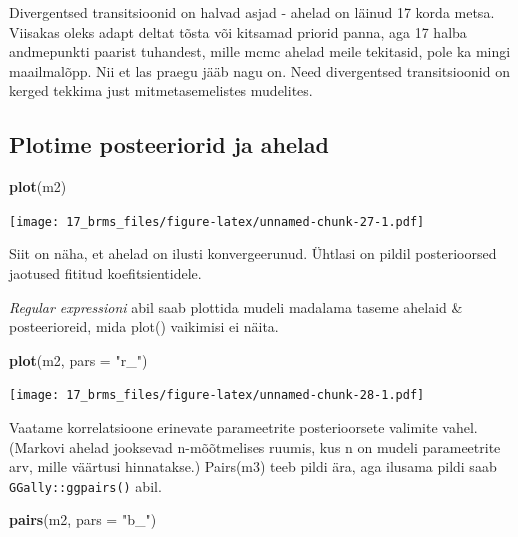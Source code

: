 \documentclass[]{book}
\newenvironment{Shaded}{\begin{snugshade}}{\end{snugshade}}
\newcommand{\DataTypeTok}[1]{\textcolor[rgb]{0.13,0.29,0.53}{#1}}
\newcommand{\KeywordTok}[1]{\textcolor[rgb]{0.13,0.29,0.53}{\textbf{#1}}}
\newcommand{\NormalTok}[1]{#1}
\newcommand{\StringTok}[1]{\textcolor[rgb]{0.31,0.60,0.02}{#1}}
\begin{document}
Divergentsed transitsioonid on halvad asjad - ahelad on läinud 17 korda metsa. Viisakas oleks adapt deltat tõsta või kitsamad priorid panna, aga 17 halba andmepunkti paarist tuhandest, mille mcmc ahelad meile tekitasid, pole ka mingi maailmalõpp. Nii et las praegu jääb nagu on. Need divergentsed transitsioonid on kerged tekkima just mitmetasemelistes mudelites.

\hypertarget{plotime-posteeriorid-ja-ahelad}{%
\subsection{Plotime posteeriorid ja ahelad}\label{plotime-posteeriorid-ja-ahelad}}

\begin{Shaded}
\begin{Highlighting}[]
\KeywordTok{plot}\NormalTok{(m2)}
\end{Highlighting}
\end{Shaded}

\texttt{[image: 17\_brms\_files/figure-latex/unnamed-chunk-27-1.pdf]}

Siit on näha, et ahelad on ilusti konvergeerunud. Ühtlasi on pildil posterioorsed jaotused fititud koefitsientidele.

\emph{Regular expressioni} abil saab plottida mudeli madalama taseme ahelaid \& posteerioreid, mida plot() vaikimisi ei näita.

\begin{Shaded}
\begin{Highlighting}[]
\KeywordTok{plot}\NormalTok{(m2, }\DataTypeTok{pars =} \StringTok{"r_"}\NormalTok{)}
\end{Highlighting}
\end{Shaded}

\texttt{[image: 17\_brms\_files/figure-latex/unnamed-chunk-28-1.pdf]}

Vaatame korrelatsioone erinevate parameetrite posterioorsete valimite vahel. (Markovi ahelad jooksevad n-mõõtmelises ruumis, kus n on mudeli parameetrite arv, mille väärtusi hinnatakse.)
Pairs(m3) teeb pildi ära, aga ilusama pildi saab \texttt{GGally::ggpairs()} abil.

\begin{Shaded}
\begin{Highlighting}[]
\KeywordTok{pairs}\NormalTok{(m2, }\DataTypeTok{pars =} \StringTok{"b_"}\NormalTok{)}
\end{Highlighting}
\end{Shaded}
\end{document}
